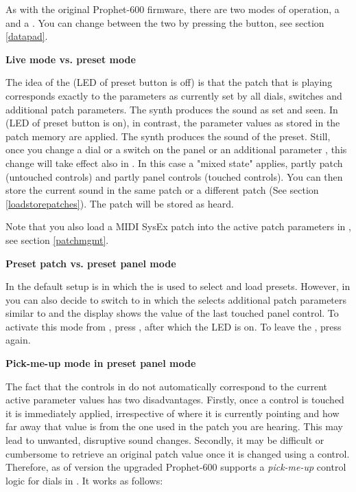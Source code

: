 As with the original Prophet-600 firmware, there are two modes of operation, a \presetmode and a \livemode. You can change between the two by pressing the \preset button, see section \ref{datapad}. 

\textbf{Live mode vs. preset mode}

The idea of the \livemode (LED of preset button is off) is that the patch that is playing corresponds exactly to the parameters as currently set by all dials, switches and additional patch parameters. The synth produces the sound as set and seen. In \presetmode (LED of preset button is on), in contrast, the parameter values as stored in the patch memory are applied. The synth produces the sound of the preset. Still, once you change a dial or a switch on the panel or an additional parameter , this change will take effect also in \presetmode. In this case a "mixed state" applies, partly patch (untouched controls) and partly panel controls (touched controls). You can then store the current sound in the same patch or a different patch (See section \ref{loadstorepatches}). The patch will be stored as heard. 

Note that you also load a MIDI SysEx patch into the active patch parameters in \presetmode, see section \ref{patchmgmt}.

\textbf{Preset patch vs. preset panel mode}

In \presetmode the default setup is \presetpatch in which the \termnumberpad is used to select and load presets. However, in \presetmode you can also decide to switch to \presetpanel in which the \termnumberpad selects additional patch parameters similar to \livemode and the display shows the value of the last touched panel control. To activate this mode from \presetpatch, press \totape, after which the LED is on. To leave the \presetpanel, press \totape again. 

\textbf{Pick-me-up mode in preset panel mode}

The fact that the controls in \presetmode do not automatically correspond to the current active parameter values has two disadvantages. Firstly, once a control is touched it is immediately applied, irrespective of where it is currently pointing and how far away that value is from the one used in the patch you are hearing. This may lead to unwanted, disruptive sound changes. Secondly, it may be difficult or cumbersome to retrieve an original patch value once it is changed using a control. Therefore, as of version \version the upgraded Prophet-600 supports a \textit{pick-me-up} control logic for dials in \presetpanel. It works as follows:

